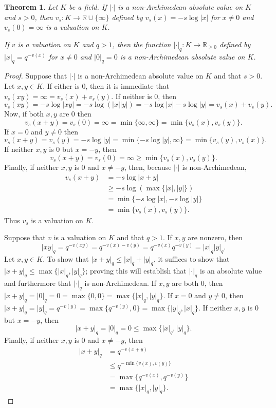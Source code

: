 \documentclass{article}
\theoremstyle{plain}
\newtheorem{theorem}{Theorem}
\theoremstyle{definition}
\begin{document}
\begin{theorem}
Let $K$ be a field. If $|\cdot|$  is a non-Archimedean absolute value on $K$
 and $s>0$, then $v_s:K \to \mathbb{R} \cup \{\infty\}$ defined by
 $v_s(x)=-s \log |x|$ for $x \neq 0$ and $v_s(0)=\infty$ is a valuation on $K$.
 
 If $v$ is a valuation on $K$ and $q>1$, then the function $|\cdot|_q:K \to \mathbb{R}_{\geq 0}$ defined by
 $|x|_q=q^{-v(x)}$ for $x \neq 0$ and $|0|_q=0$ is a non-Archimedean absolute value on $K$.
\end{theorem}
\begin{proof}
Suppose that $|\cdot|$ is a non-Archimedean absolute value on $K$ and that $s>0$. 
Let $x,y \in K$. If either is $0$, then it is immediate that $v_s(xy)=\infty=v_s(x)+v_s(y)$. 
If neither is $0$, then
\[
v_s(xy)=-s \log |xy| = -s \log(|x||y|)
=-s\log|x|-s\log|y|=v_s(x)+v_s(y).
\]
Now, if both $x,y$ are $0$ then
\[
v_s(x+y)=v_s(0)=\infty = \min\{\infty,\infty\} = \min\{v_s(x),v_s(y)\}.
\]
If $x=0$ and $y \neq 0$ then
\[
v_s(x+y)=v_s(y)=-s\log|y| = \min\{-s\log|y|,\infty\}=\min\{v_s(y),v_s(x)\}.
\]
If neither $x,y$ is $0$ but $x = -y$, then
\[
v_s(x+y)=v_s(0)=\infty \geq \min\{v_s(x),v_s(y)\}.
\]
Finally, if neither $x,y$ is $0$ and $x \neq -y$, then, because $|\cdot|$ is non-Archimedean,
\begin{align*}
v_s(x+y)&=-s\log|x+y|\\
&\geq -s\log (\max\{|x|,|y|\})\\
&=\min\{-s\log|x|,-s\log|y|\}\\
&=\min\{v_s(x),v_s(y)\}.
\end{align*}
Thus $v_s$ is a valuation on $K$.

Suppose that $v$ is a valuation on $K$ and that $q>1$. If $x,y$ are nonzero, then 
\[
|xy|_q=q^{-v(xy)} = q^{-v(x)-v(y)}=q^{-v(x)} q^{-v(y)} = |x|_q |y|_q.
\]
Let $x,y \in K$. To show that $|x+y|_q \leq |x|_q + |y|_q$, it suffices to show that
$|x+y|_q \leq \max\{|x|_q,|y|_q\}$; proving this will establish that $|\cdot|_q$ is an absolute value and furthermore
that $|\cdot|_q$ is non-Archimedean. If $x,y$ are both $0$, then
$|x+y|_q=|0|_q = 0 = \max\{0,0\}=\max\{|x|_q,|y|_q\}$. If $x =0$ and $y \neq 0$, then
$|x+y|_q=|y|_q = q^{-v(y)} = \max\{q^{-v(y)},0\}=\max\{|y|_q,|x|_q\}$. If neither $x,y$ is $0$ but
$x=-y$, then
\[
|x+y|_q=|0|_q=0 \leq \max\{|x|_q,|y|_q\}.
\]
Finally, if neither $x,y$ is $0$ and $x \neq -y$, then
\begin{align*}
|x+y|_q&=q^{-v(x+y)}\\
&\leq q^{-\min\{v(x),v(y)\}}\\
&=\max\{q^{-v(x)},q^{-v(y)}\}\\
&=\max\{|x|_q,|y|_q\}.
\end{align*}
\end{proof}
\end{document}
